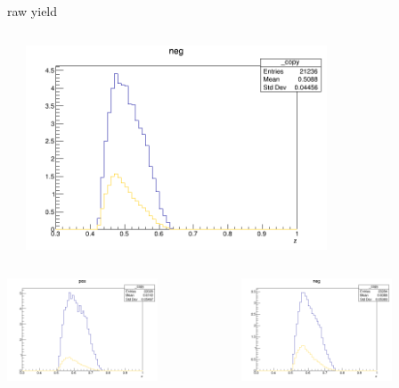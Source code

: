 \begin{frame}{raw yield}
\begin{columns}
\begin{column}[T]{0.25\textwidth}
\end{column}
\begin{column}[T]{0.25\textwidth}
\includegraphics[width = 0.7\textwidth]{results/yield/statistics/yield_x_Q2_z_0.50_5.500_0.50_neg.png}
\end{column}
\end{columns}
\begin{columns}
\begin{column}[T]{0.25\textwidth}
\includegraphics[width = 0.7\textwidth]{results/yield/statistics/yield_x_Q2_z_0.50_5.500_0.60_pos.png}
\end{column}
\begin{column}[T]{0.25\textwidth}
\includegraphics[width = 0.7\textwidth]{results/yield/statistics/yield_x_Q2_z_0.50_5.500_0.60_neg.png}

\end{column}
\end{columns}
\end{frame}
